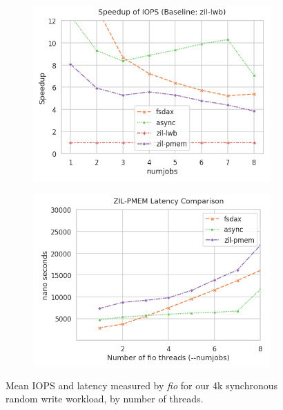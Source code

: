 \documentclass[12pt,a4paper,twoside]{book}
\begin{document}
\begin{figure}[H]
\begin{subfigure}{0.5\textwidth}
        \includegraphics[width=\textwidth]{fig/evaluation/motivating_fio_benchmark__zilpmem__speedup}
    \end{subfigure}
    \begin{subfigure}{0.5\textwidth}
        \includegraphics[width=\textwidth]{fig/evaluation/motivating_fio_benchmark__zilpmem__latency_zoomed}
    \end{subfigure}
    \caption{Mean IOPS and latency measured by \textit{fio} for our 4k synchronous random write workload, by number of threads.}
    \label{fig:eval:fio4k:metrics}
\end{figure}
\end{document}
